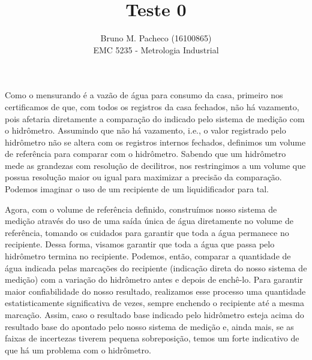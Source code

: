 \documentclass[a4paper]{report}
\begin{document}
 
\title{Teste 0}
\author{Bruno M. Pacheco (16100865)\\
EMC 5235 - Metrologia Industrial}
 
\maketitle
 
Como o mensurando é a vazão de água para consumo da casa, primeiro nos certificamos de que, com todos os registros da casa fechados, não há vazamento, pois afetaria diretamente a comparação do indicado pelo sistema de medição com o hidrômetro. Assumindo que não há vazamento, i.e., o valor registrado pelo hidrômetro não se altera com os registros internos fechados, definimos um volume de referência para comparar com o hidrômetro. Sabendo que um hidrômetro mede as grandezas com resolução de decilitros, nos restringimos a um volume que possua resolução maior ou igual para maximizar a precisão da comparação. Podemos imaginar o uso de um recipiente de um liquidificador para tal.

Agora, com o volume de referência definido, construímos nosso sistema de medição através do uso de uma saída única de água diretamente no volume de referência, tomando os cuidados para garantir que toda a água permanece no recipiente. Dessa forma, visamos garantir que toda a água que passa pelo hidrômetro termina no recipiente. Podemos, então, comparar a quantidade de água indicada pelas marcações do recipiente (indicação direta do nosso sistema de medição) com a variação do hidrômetro antes e depois de enchê-lo. Para garantir maior confiabilidade do nosso resultado, realizamos esse processo uma quantidade estatisticamente significativa de vezes, sempre enchendo o recipiente até a mesma marcação. Assim, caso o resultado base indicado pelo hidrômetro esteja acima do resultado base do apontado pelo nosso sistema de medição e, ainda mais, se as faixas de incertezas tiverem pequena sobreposição, temos um forte indicativo de que há um problema com o hidrômetro.
\end{document}
